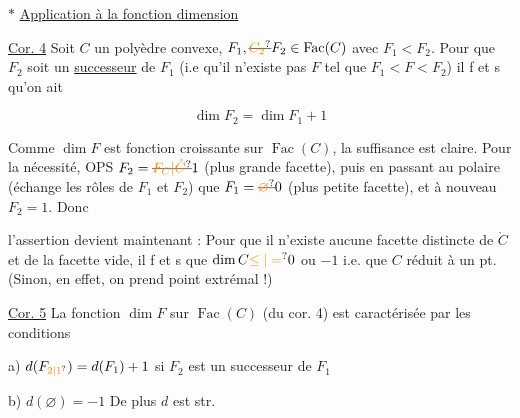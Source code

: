 
$\ast$ \uline{Application à la fonction dimension}

 \uline{Cor. 4} Soit $C$ un polyèdre convexe, $F_1,\deleted{\unsure{C_2}}F_2\in\operatorname{Fac}(C)$ avec $F_1<F_2$. Pour que $F_2$ soit un \uline{successeur} de $F_1$ (i.e qu'il n'existe pas $F$ tel que $F_1<F<F_2$) il f et s qu'on ait

\[
 \dim F_2=\dim F_1+1
\]

Comme $\dim F$ est fonction \uline{} croissante sur $\operatorname{Fac}(C)$, la suffisance est claire. Pour la nécessité,  OPS  $F_2=\deleted{\unsure{F_C|\mathring C}}1$ (plus grande facette),  puis en passant au polaire (échange les rôles de $F_1$ et $F_2$) que $F_1=\deleted{\unsure{\varnothing}}0$ (plus petite facette), et à nouveau $F_2=1$. Donc

l'assertion devient maintenant : Pour que il n'existe aucune facette  distincte de $\mathring C$ et de la facette vide, il f et s que $\dim C\unsure{\leq|=}0$ ou $-1$ i.e. que $C$  réduit à un pt.  (Sinon, en effet, on prend point extrémal !) 

\uline{Cor. 5} La fonction  $\dim F$ sur $\operatorname{Fac}(C)$ (du cor. 4) est caractérisée par les conditions

a) $d(F_{\unsure{2|1}})=d(F_1)+1$ si $F_2$ est un successeur de $F_1$

b) $d(\varnothing)=-1$  De plus $d$ est str. 
